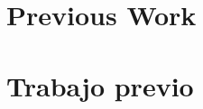 %

{
  \chapter{Previous Work}
}
{
  \chapter{Trabajo previo}
}
\label{cha:compendium-previous-work}









